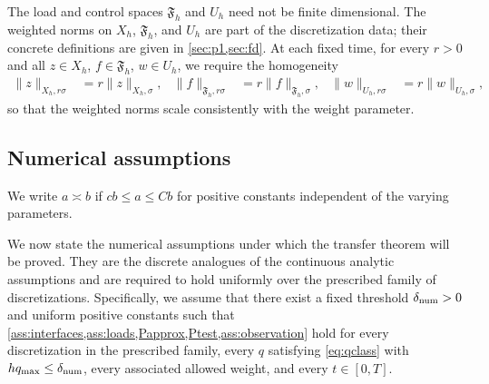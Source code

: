 \documentclass[print,wide,eng]{draft}
\begin{document}
The load and control spaces $\mathfrak F_h$ and $U_h$ need not be finite dimensional. The weighted norms on $X_h$, $\mathfrak F_h$, and $U_h$ are part of the discretization data; their concrete definitions are given in \cref{sec:p1,sec:fd}. At each fixed time, for every $r>0$ and all $z\in X_h$, $f\in\mathfrak F_h$, $w\in U_h$, we require the homogeneity
\begin{align*}
\|z\|_{X_h,r\sigma}&=r\|z\|_{X_h,\sigma},&
\|f\|_{\mathfrak F_h,r\sigma}&=r\|f\|_{\mathfrak F_h,\sigma},&
\|w\|_{U_h,r\sigma}&=r\|w\|_{U_h,\sigma},
\end{align*}
so that the weighted norms scale consistently with the weight parameter.


\subsection{Numerical assumptions}

We write $a\asymp b$ if $cb\leq a\leq Cb$ for positive constants independent of the varying parameters.

We now state the numerical assumptions under which the transfer theorem will be proved. They are the discrete analogues of the continuous analytic assumptions and are required to hold uniformly over the prescribed family of discretizations. Specifically, we assume that there exist a fixed threshold $\delta_{\rm num}>0$ and uniform positive constants such that \cref{ass:interfaces,ass:loads,Papprox,Ptest,ass:observation} hold for every discretization in the prescribed family, every $q$ satisfying \cref{eq:qclass} with $hq_{\max}\leq\delta_{\rm num}$, every associated allowed weight, and every $t\in[0,T]$.
\end{document}

